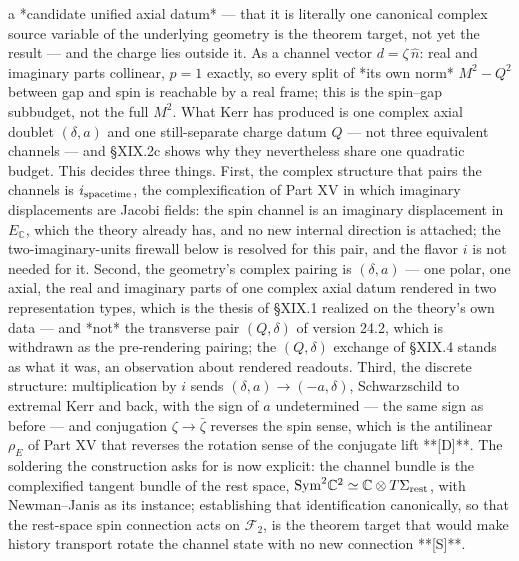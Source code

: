 a *candidate unified axial datum* — that it is literally one canonical complex source variable of the underlying geometry is the theorem target, not yet the result — and the charge lies outside it. As a channel vector $d = \zeta\,\hat n$: real and imaginary parts collinear, $p = 1$ exactly, so every split of *its own norm* $M^2-Q^2$ between gap and spin is reachable by a real frame; this is the spin–gap subbudget, not the full $M^2$. What Kerr has produced is one complex axial doublet $(\delta,a)$ and one still-separate charge datum $Q$ — not three equivalent channels — and §XIX.2c shows why they nevertheless share one quadratic budget. This decides three things. First, the complex structure that pairs the channels is $i_{\rm spacetime}$, the complexification of Part XV in which imaginary displacements are Jacobi fields: the spin channel is an imaginary displacement in $E_{\mathbb C}$, which the theory already has, and no new internal direction is attached; the two-imaginary-units firewall below is resolved for this pair, and the flavor $i$ is not needed for it. Second, the geometry's complex pairing is $(\delta,a)$ — one polar, one axial, the real and imaginary parts of one complex axial datum rendered in two representation types, which is the thesis of §XIX.1 realized on the theory's own data — and *not* the transverse pair $(Q,\delta)$ of version 24.2, which is withdrawn as the pre-rendering pairing; the $(Q,\delta)$ exchange of §XIX.4 stands as what it was, an observation about rendered readouts. Third, the discrete structure: multiplication by $i$ sends $(\delta,a)\to(-a,\delta)$, Schwarzschild to extremal Kerr and back, with the sign of $a$ undetermined — the same sign as before — and conjugation $\zeta\to\bar\zeta$ reverses the spin sense, which is the antilinear $\rho_E$ of Part XV that reverses the rotation sense of the conjugate lift **[D]**. The soldering the construction asks for is now explicit: the channel bundle is the complexified tangent bundle of the rest space, ${\rm Sym}^2\mathbb C^2\simeq\mathbb C\otimes T\Sigma_{\rm rest}$, with Newman–Janis as its instance; establishing that identification canonically, so that the rest-space spin connection acts on $\mathcal F_2$, is the theorem target that would make history transport rotate the channel state with no new connection **[S]**.

